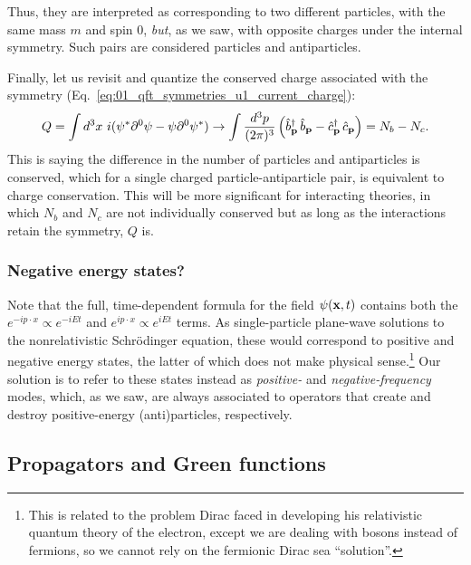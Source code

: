 Thus, they are interpreted as corresponding to two different particles, with the same mass $m$ and spin 0, \textit{but}, as we saw, with opposite charges under the \UU[1] internal symmetry.
Such pairs are considered particles and antiparticles.

Finally, let us revisit and quantize the conserved charge associated with the \UU[1] symmetry (Eq.~\ref{eq:01_qft_symmetries_u1_current_charge}):
\begin{equation}
    \label{eq:01_qft_quantization_complex_charge}
    Q = \int d^3x\ i(\psi^*\partial^0\psi - \psi\partial^0\psi^*) \rightarrow \int \frac{d^3p}{(2\pi)^3} \left(\hat b^\dagger_{\mathbf{p}}\,\hat b_{\mathbf{p}} - \hat c^\dagger_{\mathbf{p}}\,\hat c_{\mathbf{p}}\right) = N_b - N_c.
\end{equation}
This is saying the difference in the number of particles and antiparticles is conserved, which for a single charged particle-antiparticle pair, is equivalent to charge conservation.
This will be more significant for interacting theories, in which $N_b$ and $N_c$ are not individually conserved but as long as the interactions retain the \UU[1] symmetry, $Q$ is.

\subsubsection{Negative energy states?}

Note that the full, time-dependent formula for the field $\psi(\mathbf{x}, t)$ contains both the $e^{-ip\cdot x}\propto e^{-iEt}$ and $e^{ip\cdot x}\propto e^{iEt}$ terms.
As single-particle plane-wave solutions to the nonrelativistic Schr\"odinger equation, these would correspond to positive and negative energy states, the latter of which does not make physical sense.\footnote{This is related to the problem Dirac faced in developing his relativistic quantum theory of the electron, except we are dealing with bosons instead of fermions, so we cannot rely on the fermionic Dirac sea ``solution''.}
Our solution is to refer to these states instead as \textit{positive-} and \textit{negative-frequency} modes, which, as we saw, are always associated to operators that create and destroy positive-energy (anti)particles, respectively.


\subsection{Propagators and Green functions}
\label{sec:01_qft_quantization_propagators}

